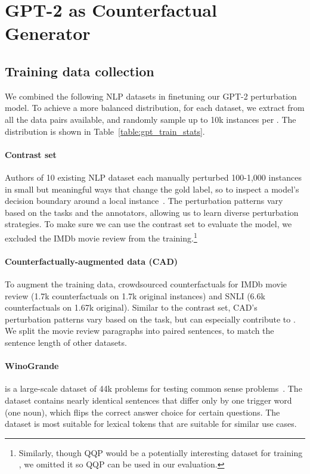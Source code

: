 \section{GPT-2 as Counterfactual Generator}
\label{appendix:train_data}

\subsection{Training data collection}


We combined the following NLP datasets in finetuning our GPT-2 perturbation model.
To achieve a more balanced distribution, for each dataset, we extract \tagstrs from all the data pairs available, and randomly sample up to 10k instances per \tagstr.
The distribution is shown in Table~\ref{table:gpt_train_stats}.

\paragraph{Contrast set}
Authors of 10 existing NLP dataset each manually perturbed 100-1,000 instances in small but meaningful ways that change the gold label, so to inspect a model's decision boundary around a local instance~\cite{gardner2020contrast}.
The perturbation patterns vary based on the tasks and the annotators, allowing us to learn diverse perturbation strategies.
To make sure we can use the contrast set to evaluate the \sst model, we excluded the IMDb movie review from the training.\footnote{Similarly, though QQP would be a potentially interesting dataset for training \sysname, we omitted it so QQP can be used in our evaluation.}


\paragraph{Counterfactually-augmented data (CAD)}
To augment the training data, \citet{kaushik2019learning} crowdsourced counterfactuals for IMDb movie review (1.7k counterfactuals on 1.7k original instances) and SNLI (6.6k counterfactuals on 1.67k original).
Similar to the contrast set, CAD's perturbation patterns vary based on the task, but can especially contribute to .
We split the movie review paragraphs into paired sentences, to match the sentence length of other datasets.


\paragraph{WinoGrande} is a large-scale dataset of 44k problems for testing common sense problems~\cite{sakaguchi2019winogrande}.
The dataset contains nearly identical sentences that differ only by one trigger word (\eg one noun), which flips the correct answer choice for certain questions.
The dataset is most suitable for lexical tokens that are suitable for similar use cases.

